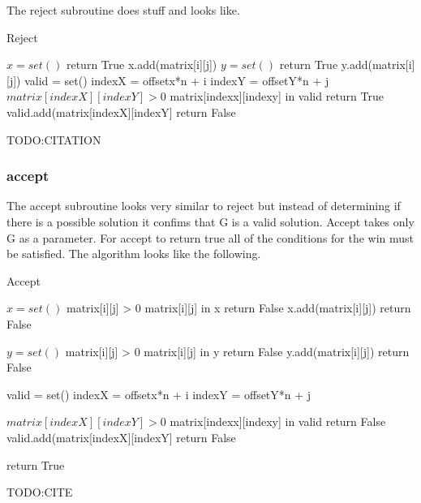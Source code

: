 \documentclass{sig-alternate}
\begin{document}
The reject subroutine does stuff and looks like.

\begin{algorithm}
\caption{Reject}\label{reject}
\begin{algorithmic}[1]
\State $x = set()$
\State return True
\EndIf
\State x.add(matrix[i][j])
\EndIf
\EndFor
\EndFor
{}
\State $y = set()$
\State return True
\EndIf
\State y.add(matrix[i][j])
\EndIf
\EndFor
\EndFor
{}
\State valid = set()
\State indexX = offsetx*n + i
\State indexY = offsetY*n + j
\If $matrix[indexX][indexY] > 0$
\If matrix[indexx][indexy] in valid 
\State return True
\EndIf
\State valid.add(matrix[indexX][indexY]
\EndIf
\EndFor
\EndFor
\EndFor
\EndFor
\State return False
\EndProcedure
\end{algorithmic}
\end{algorithm}

TODO:CITATION

\subsubsection{accept}
The accept subroutine looks very similar to reject but instead of determining if there is a possible solution it confims that G is a valid solution. Accept takes only G as a parameter. For accept to return true all of the conditions for the win must be satisfied. The algorithm looks like the following.

\begin{algorithm}
\caption{Accept}\label{accept}
\begin{algorithmic}[1]

\State $x = set()$
\If matrix[i][j] > 0
\If matrix[i][j] in x
\State return False
\EndIf
\State x.add(matrix[i][j])
\Else
\State return False
\EndIf
\EndFor
\EndFor

\State $y = set()$
\If matrix[i][j] > 0
\If matrix[i][j] in y
\State return False
\EndIf
\State y.add(matrix[i][j])
\Else
\State return False
\EndIf
\EndFor
\EndFor

\State valid = set()
\State indexX = offsetx*n + i
\State indexY = offsetY*n + j

\If $matrix[indexX][indexY] > 0$
\If matrix[indexx][indexy] in valid 
\State return False
\EndIf
\State valid.add(matrix[indexX][indexY]
\Else
\State return False
\EndIf
    
\EndFor
\EndFor
\EndFor
\EndFor
\State return True
\EndProcedure
\end{algorithmic}
\end{algorithm}
TODO:CITE
\end{document}
